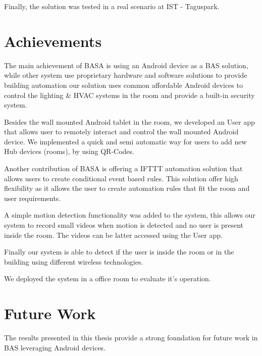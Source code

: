 Finally, the solution was tested in a real scenario  at \ac{IST} - Taguspark.


\section{Achievements}
\label{section:achievements}

The main achievement of BASA is using an Android device as a \ac{BAS} solution, while other system use proprietary hardware and software solutions to provide building automation our solution uses common affordable Android devices to control the lighting \& \ac{HVAC} systems in the room and provide a built-in security system. 

Besides the wall mounted Android tablet in the room, we developed an User app that allows user to remotely interact and control the wall mounted Android device. We implemented a quick and semi automatic way for users to add new Hub devices (rooms), by using QR-Codes.


Another contribution of BASA is offering a \ac{IFTTT} automation solution that allows users to create conditional event based rules. This solution offer high flexibility as it allows the user to create automation rules that fit the room and user requirements.

A simple motion detection functionality was added to the system, this allows our system to record small videos when motion is detected and no user is present inside the room. The videos can be latter accessed using the User app.

Finally our system is able to detect if the user is inside the room or in the building using different wireless technologies.


We deployed the system in a office room to evaluate it's operation. 






\section{Future Work}
\label{section:future}

The results presented in this thesis provide a strong foundation for future work in \ac{BAS} leveraging Android devices. 

